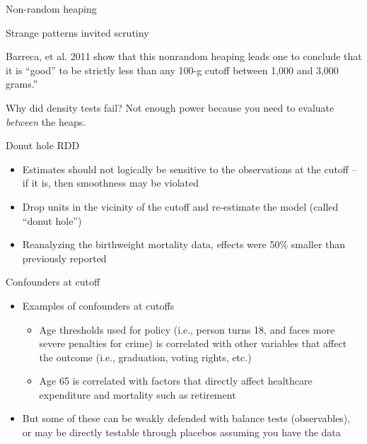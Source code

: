 \documentclass{beamer}
\begin{document}
\begin{frame}{Non-random heaping}

Strange patterns invited scrutiny

\bigskip

Barreca, et al. 2011 show that this nonrandom heaping leads one to conclude that it is ``good'' to be strictly less than any 100-g cutoff between 1,000 and 3,000 grams.''

\bigskip

Why did density tests fail? Not enough power because you need to evaluate \emph{between} the heaps.

\end{frame}



\begin{frame}{Donut hole RDD}

\begin{itemize}
\item Estimates should not logically be sensitive to the observations at the cutoff -- if it is, then smoothness may be violated
\item Drop units in the vicinity of the cutoff and re-estimate the model (called ``donut hole'')
\item Reanalyzing the birthweight mortality data, effects were 50\% smaller than previously reported
\end{itemize}

\end{frame}


\begin{frame}{Confounders at cutoff}

\begin{itemize}
\item Examples of confounders at cutoffs
	\begin{itemize}
	\item Age thresholds used for policy (i.e., person turns 18, and faces more severe penalties for crime) is correlated with other variables that affect the outcome (i.e., graduation, voting rights, etc.)
	\item Age 65 is correlated with factors that directly affect healthcare expenditure and mortality such as retirement
	\end{itemize}
\item But some of these can be weakly defended with balance tests (observables), or may be directly testable through placebos assuming you have the data
\end{itemize}

\end{frame}
	
\end{document}
